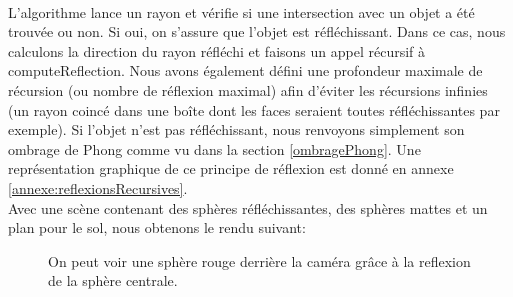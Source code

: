 \documentclass[../../Rapport RayTracer.tex]{subfiles}
\begin{document}
\hfill\\
L'algorithme lance un rayon et vérifie si une intersection avec un objet a été trouvée ou non. Si oui, on s'assure que l'objet est réfléchissant. Dans ce cas, nous calculons la direction du rayon réfléchi et faisons un appel récursif à computeReflection. Nous avons également défini une profondeur maximale de récursion (ou nombre de réflexion maximal) afin d'éviter les récursions infinies (un rayon coincé dans une boîte dont les faces seraient toutes réfléchissantes par exemple). Si l'objet n'est pas réfléchissant, nous renvoyons simplement son ombrage de Phong comme vu dans la section \ref{ombragePhong}. Une représentation graphique de ce principe de réflexion est donné en annexe \ref{annexe:reflexionsRecursives}.\\
Avec une scène contenant des sphères réfléchissantes, des sphères mattes et un plan pour le sol, nous obtenons le rendu suivant: 

\begin{figure}[h!]

	\caption{On peut voir une sphère rouge derrière la caméra grâce à la reflexion de la sphère centrale.}
	\label{reflectionsDemo}
\end{figure}
\FloatBarrier
\end{document}
